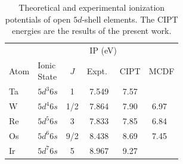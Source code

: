 \documentclass[8pt,a4paper, twoside]{report}
\begin{document}

\begin{table}[h]
\caption{Theoretical and experimental ionization potentials of open $5d$-shell elements.  The CIPT energies are the results of the present work. \label{tab:IP}}
\begin{tabular}{llcccc}
\toprule
\toprule
           &                  & \multicolumn{3}{c}{IP (eV)} \\
Atom &  \parbox{1cm}{Ionic \\ State} & $J$ &  Expt.~\cite{NIST_ASD}   & CIPT  & MCDF \\
\midrule
Ta    & $5d^3 6s$  & 1   & 7.549    & 7.57  & \\
W     & $5d^4 6s$ & 1/2 & 7.864   & 7.90  &  6.97~\cite{MCDF-Sg}  \\
Re    & $5d^5 6s$ & 3   &  7.833  &  7.85  &  6.84~\cite{MCDF-BhHs} \\
Os    & $5d^6 6s$ & 9/2 & 8.438  &  8.69  &  7.45~\cite{MCDF-BhHs} \\
Ir      & $5d^7 6s$ & 5    & 8.967 &  9.27  & \\
\bottomrule
\bottomrule
\end{tabular}
\end{table}
\end{document}
